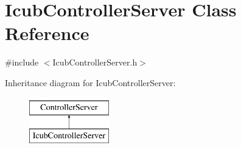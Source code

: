\hypertarget{classIcubControllerServer}{}\section{Icub\+Controller\+Server Class Reference}
\label{classIcubControllerServer}


{\ttfamily \#include $<$Icub\+Controller\+Server.\+h$>$}

Inheritance diagram for Icub\+Controller\+Server\+:\begin{figure}[H]
\begin{center}
\leavevmode
\includegraphics[height=2.000000cm]{classIcubControllerServer}
\end{center}
\end{figure}
